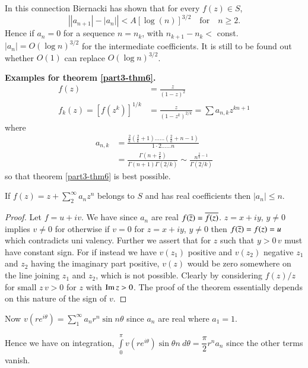 In this connection Biernacki \cite{1} has shown that for every
$f(z)\in S$, 
$$
\left||a_{n+1}|-|a_{n}|\right|<A[\log(n)]^{3/2}\quad\text{for}\quad
n\geq 2.
$$\pageoriginale
Hence if $a_{n}=0$ for a sequence $n=n_{k}$, with $n_{k+1}-n_{k}<$
const. $|a_{n}|=O(\log n)^{3/2}$ for the intermediate coefficients. It
is still to be found out whether $O(1)$ can replace $O(\log n)^{3/2}$.

\medskip
\noindent
{\bf Examples for theorem \ref{part3-thm6}.}
\begin{align*}
f(z) &=\frac{z}{(1-z)^{2}}\\
f_{k}(z)=[f(z^{k})]^{1/k} &= \frac{z}{(1-z^{k})^{2/k}}=\sum a_{n,k}z^{kn+1}
\end{align*}
where
\begin{align*}
a_{n,k} &= \frac{\frac{2}{k}\left(\frac{2}{k}+1\right)\ldots\ldots
  \left(\frac{2}{k}+n-1\right)}{1\cdot 2\ldots\ldots n}\\
&= \frac{\Gamma\left(n+\frac{2}{k}\right)}{\Gamma(n+1)\Gamma(2/k)}\sim \frac{n^{\frac{2}{k}-1}}{\Gamma(2/k)}
\end{align*}
so that theorem \ref{part3-thm6} is best possible.

\begin{thm}\label{part3-thm7}
If $f(z)=z+\sum\limits^{\infty}_{2}a_{n}z^{n}$ belongs to $S$ and has
real coefficients then $|a_{n}|\leq n$.
\end{thm}

\begin{proof}
Let $f=u+iv$. We have since $a_{n}$ are real
$f(\overline{z})=\overline{f(z)}$. $z=x+iy$, $y\neq 0$ implies $v\neq 0$ for
otherwise if $v=0$ for $z=x+iy$, $y\neq 0$ then $f(\overline{z})=f(z)=u$
which contradicts uni valency. Further we assert that for $z$ such that
$y>0\,v$ must have constant sign. For if instead we have $v(z_{1})$
positive and $v(z_{2})$ negative $z_{1}$\pageoriginale and $z_{2}$ having the
imaginary part positive, $v(z)$ would be zero somewhere on the line
joining $z_{1}$ and $z_{2}$, which is not possible. Clearly by
considering $f(z)/z$ for small $z\,v>0$ for $z$ with $\operatorname{Im} z>0$. The
proof of the theorem essentially depends on this nature of the sign of $v$.
\end{proof}

Now $v(re^{i\theta})=\sum\limits^{\infty}_{1}a_{n}r^{n}\sin n\theta$
since $a_{n}$ are real where $a_{1}=1$.

Hence we have on integration,
$\int\limits^{\pi}_{0}v(re^{i\theta})\sin\theta
n\ d\theta=\dfrac{\pi}{2}r^{n}a_{n}$ since the other terms vanish.

